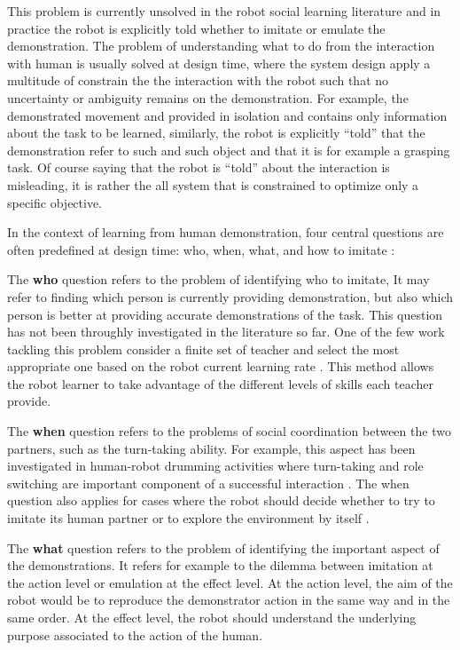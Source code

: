 This problem is currently unsolved in the robot social learning literature and in practice the robot is explicitly told whether to imitate or emulate the demonstration. The problem of understanding what to do from the interaction with human is usually solved at design time, where the system design apply a multitude of constrain the the interaction with the robot such that no uncertainty or ambiguity remains on the demonstration. For example, the demonstrated movement and provided in isolation and contains only information about the task to be learned, similarly, the robot is explicitly ``told'' that the demonstration refer to such and such object and that it is for example a grasping task. Of course saying that the robot is ``told'' about the interaction is misleading, it is rather the all system that is constrained to optimize only a specific objective.

In the context of learning from human demonstration, four central questions are often predefined at design time: who, when, what, and how to imitate \cite{nehaniv2000hummingbirds}:

The \textbf{who} question refers to the problem of identifying who to imitate, It may refer to finding which person is currently providing demonstration, but also which person is better at providing accurate demonstrations of the task. This question has not been throughly investigated in the literature so far. One of the few work tackling this problem consider a finite set of teacher and select the most appropriate one based on the robot current learning rate \cite{Nguyen2012PJBR}. This method allows the robot learner to take advantage of the different levels of skills each teacher provide.

The \textbf{when} question refers to the problems of social coordination between the two partners, such as the turn-taking ability. For example, this aspect has been investigated in human-robot drumming activities where turn-taking and role switching are important component of a successful interaction \cite{weinberg2006robot,kose2008emergent}. The when question also applies for cases where the robot should decide whether to try to imitate its human partner or to explore the environment by itself \cite{chernova09jair,Nguyen2012PJBR}. 

The \textbf{what} question refers to the problem of identifying the important aspect of the demonstrations. It refers for example to the dilemma between imitation at the action level or emulation at the effect level. At the action level, the aim of the robot would be to reproduce the demonstrator action in the same way and in the same order. At the effect level, the robot should understand the underlying purpose associated to the action of the human. 

